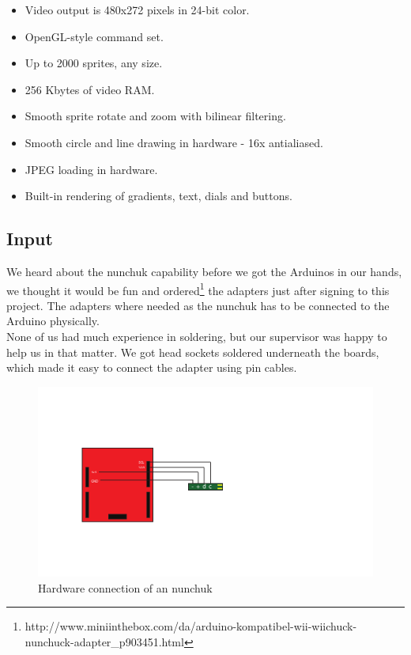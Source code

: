 \begin{multicols}{2}
\begin{itemize}
  \footnotesize
    \item Video output is 480x272 pixels in 24-bit color.
    \item OpenGL-style command set.
    \item Up to 2000 sprites, any size.
    \item 256 Kbytes of video RAM.
    \item Smooth sprite rotate and zoom with bilinear filtering.
    \item Smooth circle and line drawing in hardware - 16x antialiased.
    \item JPEG loading in hardware.
    \item Built-in rendering of gradients, text, dials and buttons.
  \end{itemize}
\end{multicols}

\subsection{Input}%
We heard about the nunchuk capability before we got the Arduinos in our
hands, we thought it would be fun and ordered\footnote{http://www.miniinthebox.com/da/arduino-kompatibel-wii-wiichuck-nunchuck-adapter\_p903451.html} the adapters just after signing
to this project. The adapters where needed as the nunchuk
has to be connected to the Arduino physically.
\\
None of us had much experience in soldering, but our supervisor was happy
to help us in that matter. We got head sockets soldered underneath
the boards, which made it easy to connect the adapter using pin cables.

\begin{figure}[h]
  \centering
  \includegraphics[scale=0.7]{Figures/NunchuckConnection}
  \caption{Hardware connection of an nunchuk}
  \label{fig:nunchuk_connect}
\end{figure}



